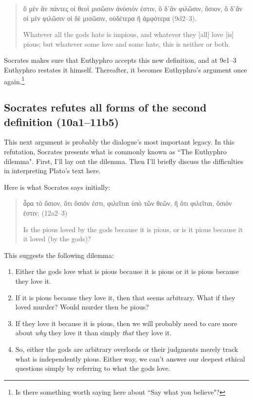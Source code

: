 \documentclass[12pt]{article}
\begin{document}
\begin{quote}

    {\g ὃ μὲν ἂν πάντες οἱ θεοὶ μισῶσιν ἀνόσιόν ἐστιν, ὃ δ᾽ἂν φιλῶσιν, ὅσιον,
    ὃ δ᾽ἂν οἱ μὲν φιλῶσιν οἱ δὲ μισῶσιν, οὐδέτερα ἢ ἀμφότερα} (9d2--3).

    Whatever all the gods hate is impious, and whatever they [all] love [is]
    pious; but whatever some love and some hate, this is neither or both.

\end{quote}

Socrates makes sure that Euthyphro accepts this new definition, and at 9e1--3
Euthyphro restates it himself.  Thereafter, it becomes Euthyphro's argument
once again.\footnote{Is there something worth saying here about ``Say what you
believe"?}


\subsection{Socrates refutes all forms of the second definition (10a1--11b5)}

This next argument is probably the dialogue's most important legacy.  In this
refutation, Socrates presents what is commonly known as ``The Euthyphro
dilemma".  First, I'll lay out the dilemma.  Then I'll briefly discuss the
difficulties in interpreting Plato's text here.

Here is what Socrates says initially:

\begin{quote}

    {\g ἆρα τὸ ὅσιον, ὅτι ὅσιόν ἐστι, φιλεῖται ὑπὸ τῶν θεῶν, ἢ ὅτι φιλεῖται,
    ὅσιόν ἐστιν;} (12a2--3)

    Is the pious loved by the gods because it is pious, or is it pious because
    it it loved (by the gods)?

\end{quote}

This suggests the following dilemma:

\begin{enumerate}

    \item Either the gods love what is pious because it is pious or it is pious
        because they love it.

    \item If it is pious because they love it, then that seems arbitrary.  What
        if they loved murder?  Would murder then be pious?

    \item If they love it because it is pious, then we will probably need to
        care more about \emph{why} they love it than simply \emph{that} they
        love it.

    \item So, either the gods are arbitrary overlords or their judgments merely
        track what is independently pious.  Either way, we can't answer our
        deepest ethical questions simply by referring to what the gods love.

\end{enumerate}
\end{document}
